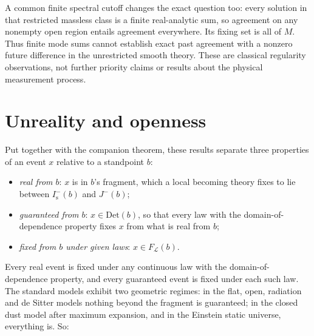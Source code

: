 \documentclass[11pt]{article}
\theoremstyle{definition}
\newcommand{\Is}{I^-_{\mathrm s}}
\newcommand{\Det}{\mathrm{Det}}
\begin{document}
A common finite spectral cutoff changes the exact question too: every
solution in that restricted massless class is a finite real-analytic sum,
so agreement on any nonempty open region entails agreement everywhere.
Its fixing set is all of $M$. Thus finite mode sums cannot establish exact
past agreement with a nonzero future difference in the unrestricted smooth
theory. These are classical regularity observations, not further priority
claims or results about the physical measurement process.

\section{Unreality and openness}\label{sec:phil}

Put together with the companion theorem, these results separate three
properties of an event $x$ relative to a standpoint $b$:
\begin{itemize}
\item \emph{real from $b$}: $x$ is in $b$'s fragment, which a local becoming
theory fixes to lie between $\Is(b)$ and $J^-(b)$;
\item \emph{guaranteed from $b$}: $x\in\Det(b)$, so that every law with the
domain-of-dependence property fixes $x$ from what is real from $b$;
\item \emph{fixed from $b$ under given laws}: $x\in F_{\mathcal L}(b)$.
\end{itemize}
Every real event is fixed under any continuous law with the
domain-of-dependence property, and every guaranteed event is fixed under
each such law. The standard models exhibit two geometric regimes: in the
flat, open, radiation and de Sitter models nothing beyond the fragment is
guaranteed; in the closed dust model after maximum expansion, and in the
Einstein static universe, everything is. So:
\end{document}
